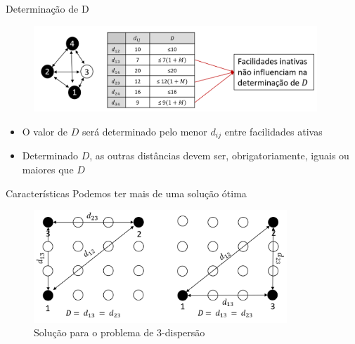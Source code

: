 \documentclass{beamer}
\begin{document}
\begin{frame}{Determinação de D}
\begin{figure}[4-nos]
    \centering
    \includegraphics[width=0.95\textwidth]{assets/PDispersao/4 nos.png}
    \label{fig:4-nos}
\end{figure}
\begin{itemize}
    \item O valor de $D$ será determinado pelo menor $d_{ij}$ entre facilidades ativas
    \item Determinado $D$, as outras distâncias devem ser, obrigatoriamente, iguais ou maiores que $D$
\end{itemize}
\end{frame}


\begin{frame}{Características}
\vspace{0.4cm}
\quad Podemos ter mais de uma solução ótima
\vspace{0cm}
\begin{figure}[3-dispersion]
    \centering
    \includegraphics[width=0.85\textwidth]{assets/PDispersao/3-dispersion.png}
    \caption{Solução para o problema de 3-dispersão}
    \label{fig:3-dispersion}
\end{figure}      
\end{frame}
\end{document}
